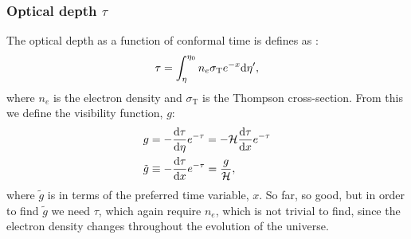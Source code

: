 \subsubsection{Optical depth $\tau$}\label{sec:m2:theory:optical_depth}
    The optical depth as a function of conformal time is defines as \cite{AST5220LectureNotes}:
    \begin{equation}\label{eq:m2:theory:optical_depth}
        \tau = \int_\eta^{\eta_0} n_e\sigma_\mathrm{T}e^{-x}\mathrm{d}\eta',
    \end{equation}
    where $n_e$ is the electron density and $\sigma_\mathrm{T}$ is the Thompson cross-section. From this we define the visibility function, $g$:
    \begin{equation}
        \begin{split}
            g &= -\dv{\tau}{\eta}e^{-\tau} = -\mathcal{H}\dv{\tau}{x}e^{-\tau}\\
            \tilde{g} &\equiv -\dv{\tau}{x}e^{-\tau} = \frac{g}{\mathcal{H}},
        \end{split}
    \end{equation}
    where $\tilde{g}$ is in terms of the preferred time variable, $x$. So far, so good, but in order to find $\tilde{g}$ we need $\tau$, which again require $n_e$, which is not trivial to find, since the electron density changes throughout the evolution of the universe.
    